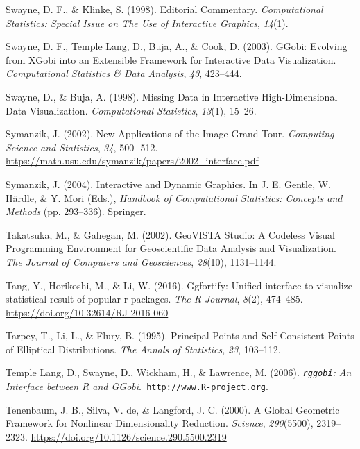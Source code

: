 \documentclass[
  letterpaper,
]{krantz}
\newlength{\cslhangindent}
\newenvironment{CSLReferences}[2] %
 {\begin{list}{}{%
  \setlength{\itemindent}{0pt}
  \setlength{\leftmargin}{0pt}
  \setlength{\parsep}{0pt}
  \ifodd #1
   \setlength{\leftmargin}{\cslhangindent}
   \setlength{\itemindent}{-1\cslhangindent}
  \fi
  \setlength{\itemsep}{#2\baselineskip}}}
 {\end{list}}
\begin{document}
\begin{CSLReferences}{1}{0}
Swayne, D. F., \& Klinke, S. (1998). Editorial {C}ommentary.
\emph{Computational Statistics: Special Issue on The Use of Interactive
Graphics}, \emph{14}(1).

Swayne, D. F., Temple Lang, D., Buja, A., \& Cook, D. (2003). {GG}obi:
{E}volving from {XG}obi into an {E}xtensible {F}ramework for
{I}nteractive {D}ata {V}isualization. \emph{Computational Statistics \&
Data Analysis}, \emph{43}, 423--444.

Swayne, D., \& Buja, A. (1998). {M}issing {D}ata in {I}nteractive
{H}igh-{D}imensional {D}ata {V}isualization. \emph{Computational
Statistics}, \emph{13}(1), 15--26.

Symanzik, J. (2002). New {A}pplications of the {I}mage {G}rand {T}our.
\emph{Computing Science and Statistics}, \emph{34}, 500-\/-512.
\url{https://math.usu.edu/symanzik/papers/2002_interface.pdf}

Symanzik, J. (2004). Interactive and {D}ynamic {G}raphics. In J. E.
Gentle, W. Härdle, \& Y. Mori (Eds.), \emph{Handbook of {C}omputational
{S}tatistics: {C}oncepts and {M}ethods} (pp. 293--336). Springer.

Takatsuka, M., \& Gahegan, M. (2002). {GeoVISTA Studio}: A {C}odeless
{V}isual {P}rogramming {E}nvironment for {G}eoscientific {D}ata
{A}nalysis and {V}isualization. \emph{The Journal of Computers and
Geosciences}, \emph{28}(10), 1131--1144.

Tang, Y., Horikoshi, M., \& Li, W. (2016). Ggfortify: Unified interface
to visualize statistical result of popular r packages. \emph{The R
Journal}, \emph{8}(2), 474--485.
\url{https://doi.org/10.32614/RJ-2016-060}

Tarpey, T., Li, L., \& Flury, B. (1995). Principal {P}oints and
{S}elf-{C}onsistent {P}oints of {E}lliptical {D}istributions. \emph{The
Annals of Statistics}, \emph{23}, 103--112.

Temple Lang, D., Swayne, D., Wickham, H., \& Lawrence, M. (2006).
\emph{{\texttt{rggobi}}: {A}n {I}nterface between {R} and
{GG}obi}.{\texttt{\ http://www.R-project.org}}.

Tenenbaum, J. B., Silva, V. de, \& Langford, J. C. (2000). A {G}lobal
{G}eometric {F}ramework for {N}onlinear {D}imensionality {R}eduction.
\emph{Science}, \emph{290}(5500), 2319--2323.
\url{https://doi.org/10.1126/science.290.5500.2319}


\end{CSLReferences}
\end{document}
